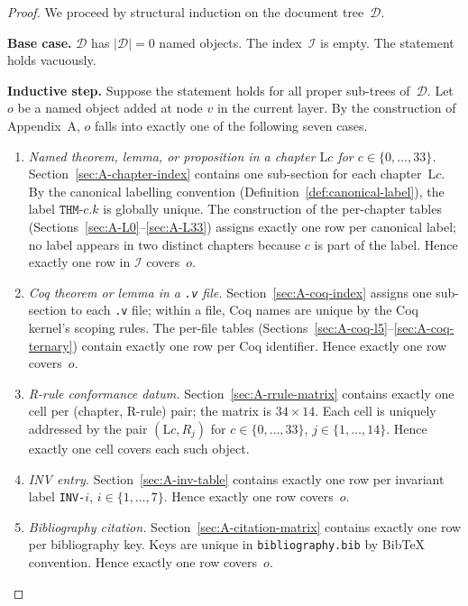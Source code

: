 \begin{proof}
We proceed by structural induction on the document tree~$\mathcal{D}$.

\medskip
\noindent\textbf{Base case.}
$\mathcal{D}$ has $|\mathcal{D}|=0$ named objects.
The index~$\mathcal{I}$ is empty.
The statement holds vacuously.

\medskip
\noindent\textbf{Inductive step.}
Suppose the statement holds for all proper sub-trees of~$\mathcal{D}$.
Let $o$ be a named object added at node $v$ in the current layer.
By the construction of Appendix~A, $o$ falls into exactly one of the
following seven cases.

\begin{enumerate}

\item \emph{Named theorem, lemma, or proposition in a chapter
  $\text{L}c$ for $c\in\{0,\ldots,33\}$.}
  Section~\ref{sec:A-chapter-index} contains one sub-section for each
  chapter~$\text{L}c$.
  By the canonical labelling convention
  (Definition~\ref{def:canonical-label}), the label
  $\texttt{THM-}c\texttt{.}k$ is globally unique.
  The construction of the per-chapter tables
  (Sections~\ref{sec:A-L0}--\ref{sec:A-L33}) assigns exactly one
  row per canonical label; no label appears in two distinct chapters
  because $c$ is part of the label.
  Hence exactly one row in $\mathcal{I}$ covers~$o$.

\item \emph{Coq theorem or lemma in a \texttt{.v} file.}
  Section~\ref{sec:A-coq-index} assigns one sub-section to each
  \texttt{.v} file; within a file, Coq names are unique by the Coq
  kernel's scoping rules.
  The per-file tables
  (Sections~\ref{sec:A-coq-l5}--\ref{sec:A-coq-ternary}) contain
  exactly one row per Coq identifier.
  Hence exactly one row covers~$o$.

\item \emph{R-rule conformance datum.}
  Section~\ref{sec:A-rrule-matrix} contains exactly one cell per
  (chapter, R-rule) pair; the matrix is $34\times 14$.
  Each cell is uniquely addressed by the pair
  $(\text{L}c, R_j)$ for $c\in\{0,\ldots,33\}$,
  $j\in\{1,\ldots,14\}$.
  Hence exactly one cell covers each such object.

\item \emph{INV entry.}
  Section~\ref{sec:A-inv-table} contains exactly one row per
  invariant label \texttt{INV-}$i$, $i\in\{1,\ldots,7\}$.
  Hence exactly one row covers~$o$.

\item \emph{Bibliography citation.}
  Section~\ref{sec:A-citation-matrix} contains exactly one row per
  bibliography key.
  Keys are unique in \texttt{bibliography.bib} by BibTeX convention.
  Hence exactly one row covers~$o$.


\end{enumerate}
\end{proof}

